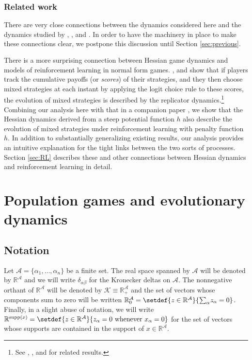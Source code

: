 \documentclass[reqno]{amsart}
\theoremstyle{plain}
\theoremstyle{definition}
\theoremstyle{remark}
\numberwithin{equation}{section}
\numberwithin{theorem}{section}
\begin{document}
\subsubsection*{Related work}
There are very close connections between the dynamics considered here and the dynamics studied by \cite{HS90}, \cite{Hop99b}, and \cite{Har11}.
In order to have the machinery in place to make these connections clear, we postpone this discussion until Section \ref{sec:previous}.

There is a more surprising connection between Hessian game dynamics and models of reinforcement learning in normal form games.
\cite{Rus99}, \cite{HSV09} and \cite{MM10} show that if players track the cumulative payoffs (or \emph{scores}) of their strategies, and they then choose mixed strategies at each instant by applying the logit choice rule to these scores, the evolution of mixed strategies is described by the replicator dynamics.\footnote{See \cite{BS97}, \cite{Pos97}, and \cite{Hop02} for related results.}
Combining our analysis here with that in a companion paper \citep{MS16}, we show that the Hessian dynamics derived from a steep potential function $h$ also describe the evolution of mixed strategies under reinforcement learning with penalty function $h$. 
In addition to substantially generalizing existing results, our analysis provides an intuitive explanation for the tight links between the two sorts of processes. 
Section \ref{sec:RL} describes these and other connections between Hessian dynamics and reinforcement learning in detail.

\section{Population games and evolutionary dynamics}
\label{sec:prelims}

\subsection*{Notation}
\label{sec:notation}

Let ${\mathcal{A}} = \{\alpha_{1},\dotsc,\alpha_{n}\}$ be a finite set.
The real space spanned by ${\mathcal{A}}$ will be denoted by ${\mathbb{R}}^{\mathcal{A}}$ and we will write $\delta_{\alpha\beta}$ for the Kronecker deltas on ${\mathcal{A}}$.
The nonnegative orthant of ${\mathbb{R}}^{\mathcal{A}}$ will be denoted by ${\mathcal{K}} \equiv {\mathbb{R}}_{+}^{\mathcal{A}}$ and the set of vectors whose components sum to zero will be written ${\mathbb{R}}_{0}^{\mathcal{A}} = \setdef{z\in{\mathbb{R}}^{\mathcal{A}}}{{\sum\nolimits}_{\alpha} z_{\alpha} = 0}$.
Finally, in a slight abuse of notation, we will write ${\mathbb{R}}^{\operatorname{supp}(x)}= \setdef{z\in{\mathbb{R}}^{\mathcal{A}}}{z_\alpha = 0 \text{ whenever } x_\alpha =0}$ for the set of vectors whose supports are contained in the support of $x\in{\mathbb{R}}^{\mathcal{A}}$.
\end{document}
